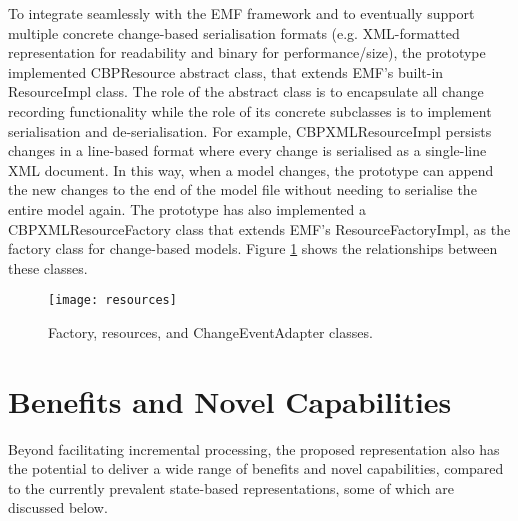 To integrate seamlessly with the EMF framework and to eventually support multiple concrete change-based serialisation formats (e.g. XML-formatted representation for readability and binary for performance/size), the prototype implemented \textsf{CBPResource} abstract class, that extends EMF's built-in \textsf{ResourceImpl} class. The role of the abstract class is to encapsulate all change recording functionality while the role of its concrete subclasses is to implement serialisation and de-serialisation. For example, \textsf{CBPXMLResourceImpl} persists changes in a line-based format where every change is serialised as a single-line XML document. In this way, when a model changes, the prototype can append the new changes to the end of the model file without needing to serialise the entire model again. The prototype has also implemented a \textsf{CBPXMLResourceFactory} class that extends EMF's \textsf{ResourceFactoryImpl}, as the factory class for change-based models. Figure \ref{fig:resources} shows the relationships between these classes.

\begin{figure}[th]
    \centering
    \texttt{[image: resources]}
    \caption{Factory, resources, and ChangeEventAdapter classes.}
    \label{fig:resources}
\end{figure}

\section{Benefits and Novel Capabilities}
\label{sec:benefits_and_novel_capabilities}
Beyond facilitating incremental processing, the proposed representation 
also has the potential to deliver a wide range of benefits and 
novel capabilities, compared to the currently prevalent 
state-based representations, some of which are discussed below.

